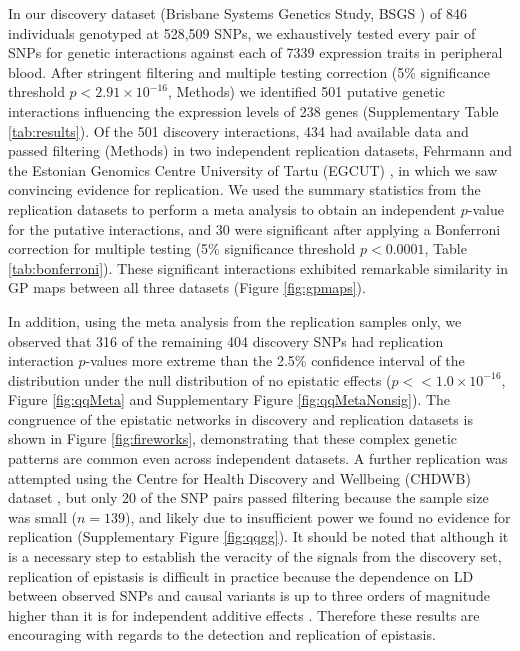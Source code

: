 \documentclass{article}
\begin{document}
In our discovery dataset (Brisbane Systems Genetics Study, BSGS \cite{Powell2012}) of 846 individuals genotyped at 528,509 SNPs, we exhaustively tested every pair of SNPs for genetic interactions against each of 7339 expression traits in peripheral blood. After stringent filtering and multiple testing correction (5\% significance threshold $ p < 2.91 \times 10^{-16}$, Methods) we identified 501 putative genetic interactions influencing the expression levels of 238 genes (Supplementary Table \ref{tab:results}). Of the 501 discovery interactions, 434 had available data and passed filtering (Methods) in two independent replication datasets, Fehrmann \cite{Fehrmann2011} and the Estonian Genomics Centre University of Tartu (EGCUT) \cite{Metspalu2004}, in which we saw convincing evidence for replication. We used the summary statistics from the replication datasets to perform a meta analysis to obtain an independent $p$-value for the putative interactions, and 30 were significant after applying a Bonferroni correction for multiple testing (5\% significance threshold $p < 0.0001$, Table \ref{tab:bonferroni}). These significant interactions exhibited remarkable similarity in GP maps between all three datasets (Figure \ref{fig:gpmaps}).

In addition, using the meta analysis from the replication samples only, we observed that 316 of the remaining 404 discovery SNPs had replication interaction $p$-values more extreme than the 2.5\% confidence interval of the distribution under the null distribution of no epistatic effects ($p << 1.0 \times 10^{-16}$, Figure \ref{fig:qqMeta} and Supplementary Figure \ref{fig:qqMetaNonsig}). The congruence of the epistatic networks in discovery and replication datasets is shown in Figure \ref{fig:fireworks}, demonstrating that these complex genetic patterns are common even across independent datasets. A further replication was attempted using the Centre for Health Discovery and Wellbeing (CHDWB) dataset \cite{Preininger2013}, but only 20 of the SNP pairs passed filtering because the sample size was small ($n=139$), and likely due to insufficient power we found no evidence for replication (Supplementary Figure \ref{fig:qqgg}). It should be noted that although it is a necessary step to establish the veracity of the signals from the discovery set, replication of epistasis is difficult in practice because the dependence on LD between observed SNPs and causal variants is up to three orders of magnitude higher than it is for independent additive effects \cite{Weir2008, Hemani2013}. Therefore these results are encouraging with regards to the detection and replication of epistasis.
\end{document}

